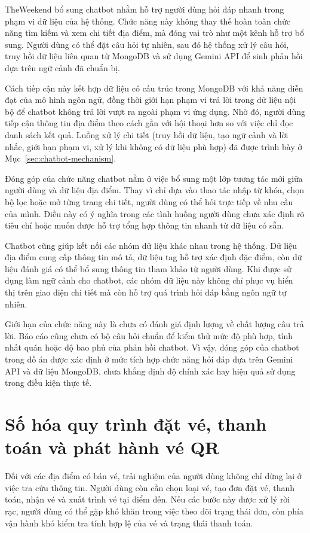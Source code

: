 \documentclass[../DoAn.tex]{subfiles}
\begin{document}
TheWeekend bổ sung chatbot nhằm hỗ trợ người dùng hỏi đáp nhanh trong phạm vi dữ liệu của hệ thống. Chức năng này không thay thế hoàn toàn chức năng tìm kiếm và xem chi tiết địa điểm, mà đóng vai trò như một kênh hỗ trợ bổ sung. Người dùng có thể đặt câu hỏi tự nhiên, sau đó hệ thống xử lý câu hỏi, truy hồi dữ liệu liên quan từ MongoDB và sử dụng Gemini API để sinh phản hồi dựa trên ngữ cảnh đã chuẩn bị.

Cách tiếp cận này kết hợp dữ liệu có cấu trúc trong MongoDB với khả năng diễn đạt của mô hình ngôn ngữ, đồng thời giới hạn phạm vi trả lời trong dữ liệu nội bộ để chatbot không trả lời vượt ra ngoài phạm vi ứng dụng. Nhờ đó, người dùng tiếp cận thông tin địa điểm theo cách gần với hội thoại hơn so với việc chỉ đọc danh sách kết quả. Luồng xử lý chi tiết (truy hồi dữ liệu, tạo ngữ cảnh và lời nhắc, giới hạn phạm vi, xử lý khi không có dữ liệu phù hợp) đã được trình bày ở Mục~\ref{sec:chatbot-mechanism}.

Đóng góp của chức năng chatbot nằm ở việc bổ sung một lớp tương tác mới giữa người dùng và dữ liệu địa điểm. Thay vì chỉ dựa vào thao tác nhập từ khóa, chọn bộ lọc hoặc mở từng trang chi tiết, người dùng có thể hỏi trực tiếp về nhu cầu của mình. Điều này có ý nghĩa trong các tình huống người dùng chưa xác định rõ tiêu chí hoặc muốn được hỗ trợ tổng hợp thông tin nhanh từ dữ liệu có sẵn.

Chatbot cũng giúp kết nối các nhóm dữ liệu khác nhau trong hệ thống. Dữ liệu địa điểm cung cấp thông tin mô tả, dữ liệu tag hỗ trợ xác định đặc điểm, còn dữ liệu đánh giá có thể bổ sung thông tin tham khảo từ người dùng. Khi được sử dụng làm ngữ cảnh cho chatbot, các nhóm dữ liệu này không chỉ phục vụ hiển thị trên giao diện chi tiết mà còn hỗ trợ quá trình hỏi đáp bằng ngôn ngữ tự nhiên.

Giới hạn của chức năng này là chưa có đánh giá định lượng về chất lượng câu trả lời. Báo cáo cũng chưa có bộ câu hỏi chuẩn để kiểm thử mức độ phù hợp, tính nhất quán hoặc độ bao phủ của phản hồi chatbot. Vì vậy, đóng góp của chatbot trong đồ án được xác định ở mức tích hợp chức năng hỏi đáp dựa trên Gemini API và dữ liệu MongoDB, chưa khẳng định độ chính xác hay hiệu quả sử dụng trong điều kiện thực tế.

\section{Số hóa quy trình đặt vé, thanh toán và phát hành vé QR}

Đối với các địa điểm có bán vé, trải nghiệm của người dùng không chỉ dừng lại ở việc tra cứu thông tin. Người dùng còn cần chọn loại vé, tạo đơn đặt vé, thanh toán, nhận vé và xuất trình vé tại điểm đến. Nếu các bước này được xử lý rời rạc, người dùng có thể gặp khó khăn trong việc theo dõi trạng thái đơn, còn phía vận hành khó kiểm tra tính hợp lệ của vé và trạng thái thanh toán.
\end{document}
